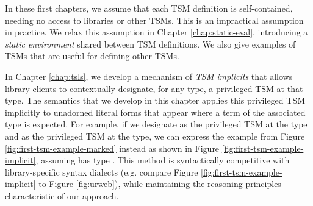 In these first chapters, we assume that each TSM definition is self-contained, needing no access to libraries or other TSMs. This is an impractical assumption in practice. We relax this assumption in Chapter \ref{chap:static-eval}, introducing a \emph{static environment} shared between TSM definitions. We also give examples of TSMs that are useful for defining other TSMs.

In Chapter \ref{chap:tsls}, we develop a mechanism of \emph{TSM implicits} that allows library clients to contextually designate, for any type, a privileged TSM at that type. The semantics that we develop in this chapter applies this privileged TSM implicitly to unadorned literal forms that appear where a term of the associated type is expected. For example, if we designate  as the privileged TSM at the  type and  as the privileged TSM at the  type, we can express the example from Figure \ref{fig:first-tsm-example-marked} instead as shown in Figure \ref{fig:first-tsm-example-implicit}, assuming  has type . This method is syntactically competitive with library-specific syntax dialects (e.g. compare Figure \ref{fig:first-tsm-example-implicit} to Figure \ref{fig:urweb}), while maintaining the reasoning principles characteristic of our approach. 

